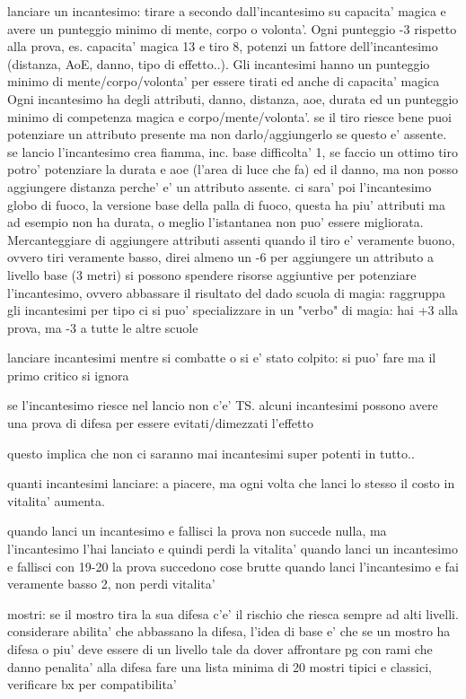 \documentclass[12pt,a4paper,twoside,openany]{book}
\begin{document}
lanciare un incantesimo: tirare a secondo dall'incantesimo su capacita' magica e avere un punteggio minimo di  mente, corpo o volonta'.  Ogni punteggio -3 rispetto alla prova, es. capacita' magica 13 e tiro 8, potenzi un fattore dell'incantesimo (distanza, AoE, danno, tipo di effetto..). Gli incantesimi hanno un punteggio minimo di mente/corpo/volonta' per essere tirati ed anche di capacita' magica
Ogni incantesimo ha degli attributi, danno, distanza, aoe, durata ed un punteggio minimo di competenza magica e corpo/mente/volonta'. se il tiro riesce bene puoi potenziare un attributo presente ma non darlo/aggiungerlo se questo e' assente. se lancio l'incantesimo crea fiamma, inc. base difficolta' 1, se faccio un ottimo tiro potro' potenziare la durata e aoe (l'area di luce che fa) ed il danno, ma non posso aggiungere distanza perche' e' un attributo assente.
ci sara' poi l'incantesimo globo di fuoco, la versione base della palla di fuoco, questa ha piu' attributi ma ad esempio non ha durata, o meglio l'istantanea non puo' essere migliorata.
Mercanteggiare di aggiungere attributi assenti quando il tiro e' veramente buono, ovvero tiri veramente basso, direi almeno un -6 per aggiungere un attributo a livello base (3 metri)
si possono spendere risorse aggiuntive per potenziare l'incantesimo, ovvero abbassare il risultato del dado
scuola di magia: raggruppa gli incantesimi per tipo
ci si puo' specializzare in un "verbo" di magia: hai +3 alla prova, ma -3 a tutte le altre scuole

lanciare incantesimi mentre si combatte o si e' stato colpito: si puo' fare ma il primo critico si ignora

se l'incantesimo riesce nel lancio non c'e' TS. alcuni incantesimi possono avere una prova di difesa per essere evitati/dimezzati l'effetto

questo implica che non ci saranno mai incantesimi super potenti in tutto..

quanti incantesimi lanciare:  a piacere, ma ogni volta che lanci lo stesso il costo in vitalita' aumenta. 

quando lanci un incantesimo e fallisci la prova non succede nulla, ma l'incantesimo l'hai lanciato e quindi perdi la vitalita' 
quando lanci un incantesimo e fallisci con 19-20 la prova succedono cose  brutte
quando lanci l'incantesimo e fai veramente basso 2, non perdi vitalita'


mostri:
se il mostro tira la sua difesa c'e' il rischio che riesca sempre ad alti livelli. considerare abilita' che abbassano la difesa, l'idea di base e' che se un mostro ha difesa  o piu' deve essere di un livello tale da dover affrontare pg con rami che danno penalita' alla difesa
fare una lista minima di 20 mostri tipici e classici, verificare bx per compatibilita'
\end{document}
